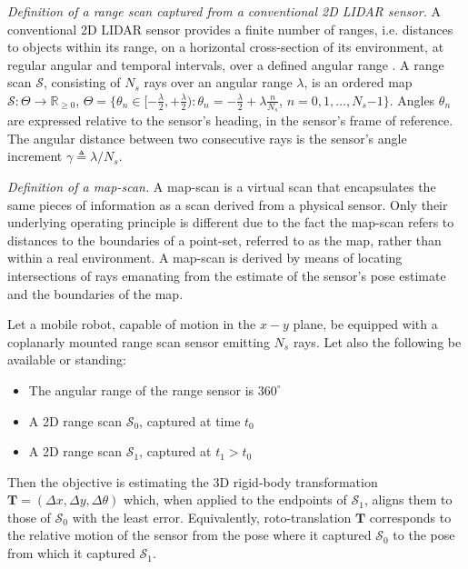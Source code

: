 \begin{definition}
  \label{def:definition_1}
  \textit{Definition of a range scan captured from a conventional 2D LIDAR
  sensor.} A conventional 2D LIDAR sensor provides a finite number of ranges,
  i.e. distances to objects within its range, on a horizontal cross-section of
  its environment, at regular angular and temporal intervals, over a defined
  angular range \cite{lidar}. A range scan $\mathcal{S}$, consisting
  of $N_s$ rays over an angular range $\lambda$, is an ordered map
  $\mathcal{S} : \Theta \rightarrow \mathbb{R}_{\geq 0}$, $\Theta =
  \{\theta_n \in [-\frac{\lambda}{2}, +\frac{\lambda}{2}) : \theta_n =
  -\frac{\lambda}{2} + \lambda \frac{n}{N_s}$, $n = 0,1,\dots, N_s$$-$$1$$\}$.
  Angles $\theta_n$ are expressed relative to the sensor's heading, in the
  sensor's frame of reference. The angular distance between two consecutive
  rays is the sensor's angle increment $\gamma \triangleq \lambda/N_s$.
\end{definition}

\begin{definition}
  \label{def:definition_3}
  \textit{Definition of a map-scan.}
  A map-scan is a virtual scan that encapsulates the same pieces of information
  as a scan derived from a physical sensor. Only their underlying operating
  principle is different due to the fact the map-scan refers to distances to
  the boundaries of a point-set, referred to as the map, rather than within a
  real environment. A map-scan is derived by means of locating intersections of
  rays emanating from the estimate of the sensor's pose estimate and the
  boundaries of the map.
\end{definition}

\begin{problem}
  \label{prob:the_problem}
  Let a mobile robot, capable of motion in the $x-y$ plane, be equipped with a
  coplanarly mounted range scan sensor emitting $N_s$ rays. Let
  also the following be available or standing:
  \begin{itemize}
    \item The angular range of the range sensor is $360^\circ$
    \item A 2D range scan $\mathcal{S}_0$, captured at time $t_0$
    \item A 2D range scan $\mathcal{S}_1$, captured at $t_1 > t_0$
  \end{itemize}
\end{problem}
Then the objective is estimating the 3D rigid-body transformation
$\bm{T} = (\Delta x, \Delta y, \Delta \theta)$ which, when applied to the
endpoints of $\mathcal{S}_1$, aligns them to those of $\mathcal{S}_0$ with the
least error. Equivalently, roto-translation $\bm{T}$ corresponds to the
relative motion of the sensor from the pose where it captured $\mathcal{S}_0$
to the pose from which it captured $\mathcal{S}_1$.
